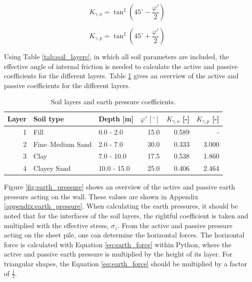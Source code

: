 \begin{equation}
    K_{\gamma,a} = \tan^{2}\!\left(45^\circ - \frac{\varphi'}{2}\right)
    \label{eq:Ka_tan}
\end{equation}

\begin{equation}
    K_{\gamma,p} = \tan^{2}\!\left(45^\circ + \frac{\varphi'}{2}\right)
    \label{eq:Kp_tan}
\end{equation}

Using Table \ref{tab:soil_layers}, in which all soil parameters are included, the effective angle of internal friction is needed to calculate the active and passive coefficients for the different layers. Table \ref{tab:layers_ka_kp} gives an overview of the active and passive coefficients for the different layers. 

\begin{table}[H]
  \centering
  \caption{Soil layers and earth pressure coefficients.}
  \label{tab:layers_ka_kp}
  \small
  \setlength{\tabcolsep}{8pt}
  \renewcommand{\arraystretch}{1.15}
  \begin{tabular}{@{}r l l r r r@{}}
    \toprule
    Layer & Soil type & Depth [m] &
    $\varphi'\,[\boldsymbol{^\circ}]$ &
    $K_{\gamma,a}$ [-] & $K_{\gamma,p}$ [-] \\
    \midrule
    1 & Fill             & 0.0 - 2.0   & 15.0 & 0.589 & - \\
    2 & Fine--Medium Sand& 2.0 - 7.0   & 30.0 & 0.333 & 3.000 \\
    3 & Clay             & 7.0 - 10.0  & 17.5 & 0.538 & 1.860 \\
    4 & Clayey Sand      & 10.0 - 15.0 & 25.0 & 0.406 & 2.464 \\
    \bottomrule 
  \end{tabular}
\end{table}

Figure \ref{fig:earth_pressure} shows an overview of the active and passive earth pressure acting on the wall. These values are shown in Appendix \ref{appendix:earth_pressure}. When calculating the earth pressures, it should be noted that for the interfaces of the soil layers, the rightful coefficient is taken and multiplied with the effective stress, $\sigma_{z}$. From the active and passive pressure acting on the sheet pile, one can determine the horizontal forces. The horizontal force is calculated with Equation \ref{eq:earth_force} within Python, where the active and passive earth pressure is multiplied by the height of its layer. For triangular shapes, the Equation \ref{eq:earth_force} should be multiplied by a factor of $\frac{1}{2}$.

